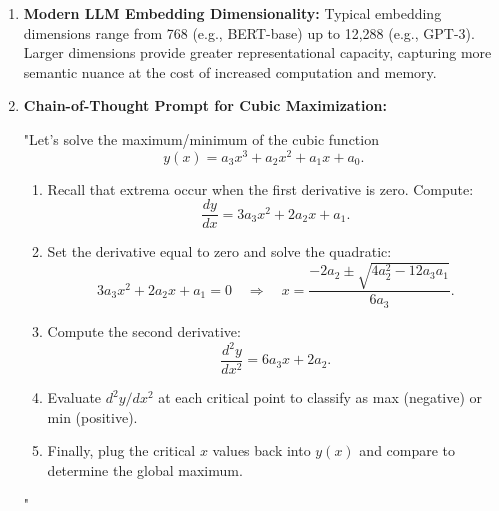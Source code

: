 \documentclass[12pt]{article}
\begin{document}
\begin{enumerate}
  \item \textbf{Modern LLM Embedding Dimensionality:} 
    Typical embedding dimensions range from 768 (e.g., BERT-base) up to 12,288 (e.g., GPT-3).  Larger dimensions provide greater representational capacity, capturing more semantic nuance at the cost of increased computation and memory.

  \item \textbf{Chain-of-Thought Prompt for Cubic Maximization:}
    \begin{tcolorbox}[colback=gray!5,colframe=gray!40]
    "Let's solve the maximum/minimum of the cubic function
    \begin{equation*}
      y(x)=a_3 x^3 + a_2 x^2 + a_1 x + a_0.
    \end{equation*}
    \begin{enumerate}
      \item Recall that extrema occur when the first derivative is zero. Compute:
        \begin{equation*}
          \frac{dy}{dx}=3a_3 x^2 + 2a_2 x + a_1.
        \end{equation*}
      \item Set the derivative equal to zero and solve the quadratic:
        \begin{equation*}
          3a_3 x^2 + 2a_2 x + a_1 = 0 \quad \Rightarrow \quad x=\frac{-2a_2 \pm \sqrt{4a_2^2 -12a_3 a_1}}{6a_3}.
        \end{equation*}
      \item Compute the second derivative:
        \begin{equation*}
          \frac{d^2y}{dx^2}=6a_3 x + 2a_2.
        \end{equation*}
      \item Evaluate $d^2y/dx^2$ at each critical point to classify as max (negative) or min (positive).
      \item Finally, plug the critical $x$ values back into $y(x)$ and compare to determine the global maximum.
    \end{enumerate}"
    \end{tcolorbox}

\end{enumerate}
\end{document}

